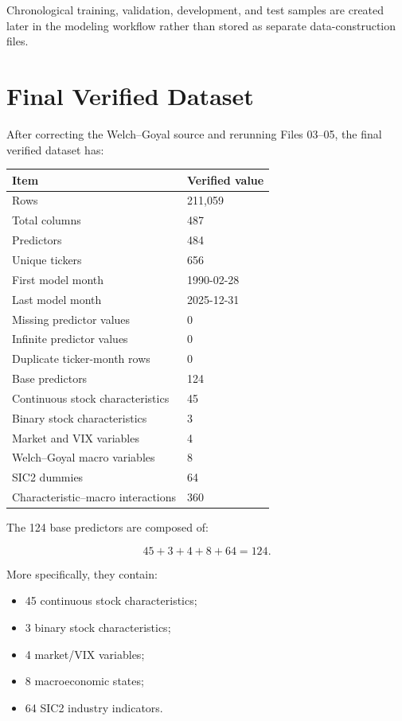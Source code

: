 \documentclass[11pt,a4paper]{article}
\begin{document}
Chronological training, validation, development, and test samples are created
later in the modeling workflow rather than stored as separate data-construction
files.


\section{Final Verified Dataset}

After correcting the Welch--Goyal source and rerunning Files 03--05, the final
verified dataset has:

\begin{center}
\begin{tabularx}{0.86\textwidth}{p{6.0cm}Y}
\toprule
Item & Verified value \\
\midrule
Rows & 211,059 \\
Total columns & 487 \\
Predictors & 484 \\
Unique tickers & 656 \\
First model month & 1990-02-28 \\
Last model month & 2025-12-31 \\
Missing predictor values & 0 \\
Infinite predictor values & 0 \\
Duplicate ticker-month rows & 0 \\
Base predictors & 124 \\
Continuous stock characteristics & 45 \\
Binary stock characteristics & 3 \\
Market and VIX variables & 4 \\
Welch--Goyal macro variables & 8 \\
SIC2 dummies & 64 \\
Characteristic--macro interactions & 360 \\
\bottomrule
\end{tabularx}
\end{center}

The 124 base predictors are composed of:

\[
45
+3
+4
+8
+64
=124.
\]

More specifically, they contain:

\begin{itemize}
  \item 45 continuous stock characteristics;
  \item 3 binary stock characteristics;
  \item 4 market/VIX variables;
  \item 8 macroeconomic states;
  \item 64 SIC2 industry indicators.
\end{itemize}
\end{document}
